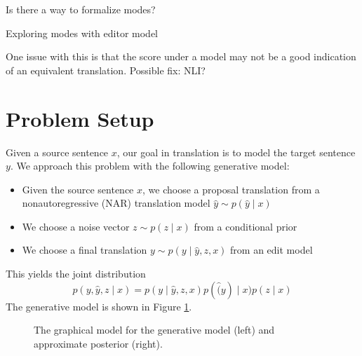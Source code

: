 \documentclass[11pt]{article}
\begin{document}
{\color{red}Is there a way to formalize modes?}

{\color{red}Exploring modes with editor model}

One issue with this is that the score under a model may not be a good indication of an
equivalent translation. Possible fix: NLI?


\section{Problem Setup}
Given a source sentence $x$, our goal in translation is to model the target sentence $y$.
We approach this problem with the following generative model:
\begin{itemize}
\item Given the source sentence $x$, we choose a proposal translation
    from a nonautoregressive (NAR) translation model  $\hat{y}\sim p(\hat{y} \mid x)$
\item We choose a noise vector $z \sim p(z \mid x)$ from a conditional prior
\item We choose a final translation $y \sim p(y \mid \hat{y}, z, x)$ from an edit model
\end{itemize}
This yields the joint distribution
$$p(y,\hat{y},z \mid x) = p(y \mid \hat{y}, z, x)p(\hat(y) \mid x)p(z \mid x)$$
The generative model is shown in Figure \ref{fig:gen-model}.

\begin{figure}
\centering
\begin{subfigure}{0.48\textwidth}
\centering
{}
\end{subfigure}
\hfill
\begin{subfigure}{0.48\textwidth}
\centering
{}
\end{subfigure}

\caption{
\label{fig:gen-model}
The graphical model for the generative model (left)
and approximate posterior (right).
}
\end{figure}
\end{document}
